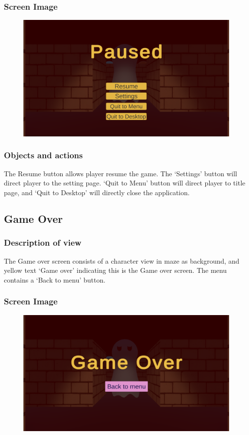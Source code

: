\documentclass[11pt]{article}
\begin{document}
\subsubsection{Screen Image}
\begin{figure}[H]
    \centering
    \includegraphics*[scale=0.2]{UI2.1PauseMenu.png}
\end{figure}
\subsubsection{Objects and actions}
The Resume button allows player resume the game. The `Settings' button will direct player to the setting page. `Quit to Menu' button will direct player to title page, and `Quit to Desktop' will directly close the application.
\subsection{Game Over}
\subsubsection{Description of view}
The Game over screen consists of a character view in maze as background, and yellow text `Game over' indicating this is the Game over screen. The menu contains a `Back to menu' button.
\subsubsection{Screen Image}
\begin{figure}[H]
    \centering
    \includegraphics*[scale=0.2]{UI2.2GameOver.png}
\end{figure}
\end{document}

